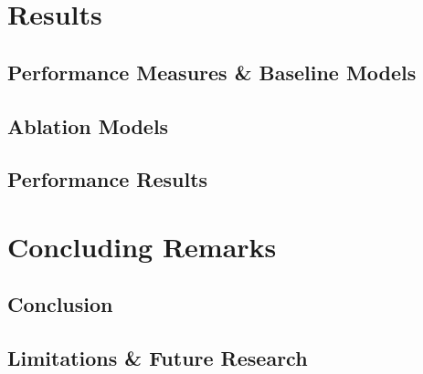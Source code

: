 \documentclass[american, oneside]{ecsgdp}
\begin{document}

\chapter{Results} \label{chap:results}
\section{Performance Measures \& Baseline Models} \label{sec:measures}
\section{Ablation Models} \label{sec:ablation_models}
\section{Performance Results} \label{sec:performance}

\chapter{Concluding Remarks} \label{chap:remarks}
\section{Conclusion} \label{sec:conclusion}
\section{Limitations \& Future Research} \label{sec:limitation}

\backmatter

\printbibliography
% 
% 

\appendix
\end{document}
